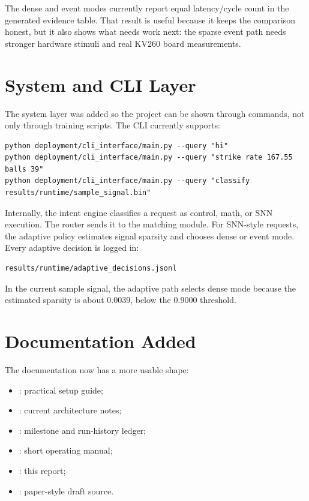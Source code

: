 \documentclass[11pt]{article}
\begin{document}
The dense and event modes currently report equal latency/cycle count in the
generated evidence table. That result is useful because it keeps the comparison
honest, but it also shows what needs work next: the sparse event path needs
stronger hardware stimuli and real KV260 board measurements.

\section{System and CLI Layer}
The system layer was added so the project can be shown through commands, not only
through training scripts. The CLI currently supports:
\begin{lstlisting}[style=plaincmd]
python deployment/cli_interface/main.py --query "hi"
python deployment/cli_interface/main.py --query "strike rate 167.55 balls 39"
python deployment/cli_interface/main.py --query "classify results/runtime/sample_signal.bin"
\end{lstlisting}

Internally, the intent engine classifies a request as control, math, or SNN
execution. The router sends it to the matching module. For SNN-style requests,
the adaptive policy estimates signal sparsity and chooses dense or event mode.
Every adaptive decision is logged in:
\begin{lstlisting}[style=plaincmd]
results/runtime/adaptive_decisions.jsonl
\end{lstlisting}

In the current sample signal, the adaptive path selects dense mode because the
estimated sparsity is about 0.0039, below the 0.9000 threshold.

\section{Documentation Added}
The documentation now has a more usable shape:
\begin{itemize}[leftmargin=*]
\item {}: practical setup guide;
\item {}: current architecture notes;
\item {}: milestone and run-history ledger;
\item {}: short operating manual;
\item {}: this report;
\item {}: paper-style draft source.
\end{itemize}
\end{document}
